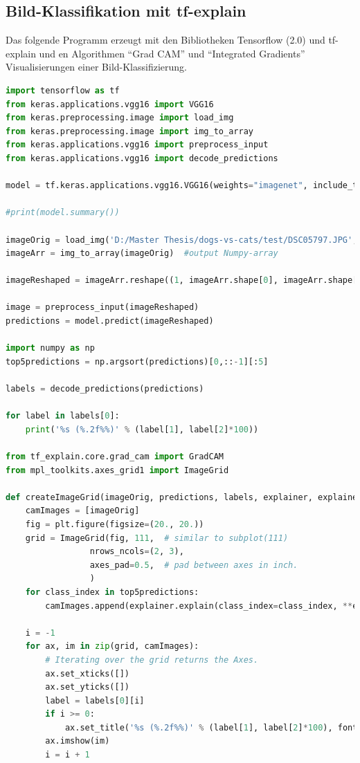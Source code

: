 \documentclass[
  12pt, %
  a4paper, %
  oneside, %
  openany, 
  numbers=noenddot, %
  BCOR=5mm, %
  parskip=half*, %
  thesis, %
]{bfhbook}
\begin{document}
\subsection{Bild-Klassifikation mit tf-explain}
Das folgende Programm erzeugt mit den Bibliotheken Tensorflow (2.0) und tf-explain und en Algorithmen ``Grad CAM'' und ``Integrated Gradients'' Visualisierungen einer Bild-Klassifizierung. 
\begin{lstlisting}[language=Python, caption=Visualisiertes Neuronales Netz mit Tensorflow und tf-explain]
import tensorflow as tf
from keras.applications.vgg16 import VGG16
from keras.preprocessing.image import load_img
from keras.preprocessing.image import img_to_array
from keras.applications.vgg16 import preprocess_input
from keras.applications.vgg16 import decode_predictions

model = tf.keras.applications.vgg16.VGG16(weights="imagenet", include_top=True)

#print(model.summary())

imageOrig = load_img('D:/Master Thesis/dogs-vs-cats/test/DSC05797.JPG', target_size=(224, 224))
imageArr = img_to_array(imageOrig)  #output Numpy-array

imageReshaped = imageArr.reshape((1, imageArr.shape[0], imageArr.shape[1], imageArr.shape[2]))

image = preprocess_input(imageReshaped)
predictions = model.predict(imageReshaped)

import numpy as np
top5predictions = np.argsort(predictions)[0,::-1][:5]

labels = decode_predictions(predictions)

for label in labels[0]:
    print('%s (%.2f%%)' % (label[1], label[2]*100))
    
from tf_explain.core.grad_cam import GradCAM
from mpl_toolkits.axes_grid1 import ImageGrid

def createImageGrid(imageOrig, predictions, labels, explainer, explainerArgs):
    camImages = [imageOrig]
    fig = plt.figure(figsize=(20., 20.))
    grid = ImageGrid(fig, 111,  # similar to subplot(111)
                 nrows_ncols=(2, 3),
                 axes_pad=0.5,  # pad between axes in inch.
                 )
    for class_index in top5predictions:
        camImages.append(explainer.explain(class_index=class_index, **explainerArgs))
    
    i = -1
    for ax, im in zip(grid, camImages):
        # Iterating over the grid returns the Axes.
        ax.set_xticks([])
        ax.set_yticks([])
        label = labels[0][i]
        if i >= 0:
            ax.set_title('%s (%.2f%%)' % (label[1], label[2]*100), fontsize=20)
        ax.imshow(im)
        i = i + 1


\end{lstlisting}
\end{document}
